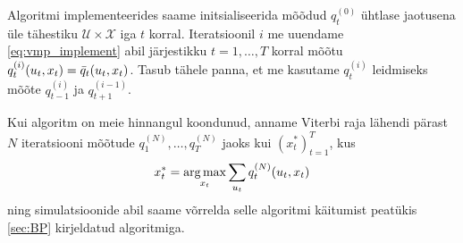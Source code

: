 
Algoritmi implementeerides saame initsialiseerida mõõdud $q_t^{(0)}$ ühtlase jaotusena üle tähestiku $\mathcal{U} \times \mathcal{X}$ iga $t$ korral. Iteratsioonil $i$ me uuendame \eqref{eq:vmp_implement} abil järjestikku $t = 1, \ldots, T$ korral mõõtu $q_t^{(i)}(u_t,x_t) = \Bar{q}_t(u_t, x_t)$. Tasub tähele panna, et me kasutame $q_t^{(i)}$ leidmiseks mõõte $q_{t-1}^{(i)}$ ja $q_{t+1}^{(i-1)}$.

Kui algoritm on meie hinnangul koondunud, anname Viterbi raja lähendi pärast $N$ iteratsiooni mõõtude $q_1^{(N)},\ldots,q_T^{(N)}$ jaoks kui $(x^*_t)_{t=1}^T$, kus
$$x^*_t = \operatorname*{arg\,max}_{x_t} \sum_{u_t} q_t^{(N)}(u_t, x_t)$$
ning simulatsioonide abil saame võrrelda selle algoritmi käitumist peatükis \ref{sec:BP} kirjeldatud algoritmiga.



